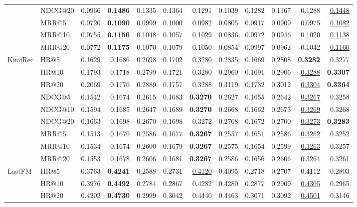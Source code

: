 \begin{tabular}{llrrrrrrrrrr}
 & NDCG@20 & 0.0966 & \textbf{0.1486} & 0.1335 & 0.1364 & 0.1291 & 0.1039 & 0.1282 & 0.1167 & 0.1288 & \underline{0.1448} \\
 & MRR@5 & 0.0720 & \textbf{0.1090} & 0.0999 & 0.1000 & 0.0982 & 0.0805 & 0.0917 & 0.0909 & 0.0975 & \underline{0.1082} \\
 & MRR@10 & 0.0755 & \textbf{0.1150} & 0.1048 & 0.1057 & 0.1029 & 0.0836 & 0.0972 & 0.0946 & 0.1020 & \underline{0.1138} \\
 & MRR@20 & 0.0772 & \textbf{0.1175} & 0.1070 & 0.1079 & 0.1050 & 0.0854 & 0.0997 & 0.0962 & 0.1042 & \underline{0.1160} \\
\hline
KuaiRec & HR@5 & 0.1629 & 0.1686 & 0.2698 & 0.1702 & \underline{0.3280} & 0.2835 & 0.1669 & 0.2808 & \textbf{0.3282} & 0.3277 \\
 & HR@10 & 0.1793 & 0.1718 & 0.2799 & 0.1721 & 0.3280 & 0.2960 & 0.1691 & 0.2906 & \underline{0.3288} & \textbf{0.3307} \\
 & HR@20 & 0.2069 & 0.1770 & 0.2889 & 0.1757 & 0.3288 & 0.3119 & 0.1732 & 0.3012 & \underline{0.3304} & \textbf{0.3364} \\
 & NDCG@5 & 0.1542 & 0.1674 & 0.2615 & 0.1683 & \textbf{0.3270} & 0.2627 & 0.1655 & 0.2642 & \underline{0.3267} & 0.3258 \\
 & NDCG@10 & 0.1594 & 0.1685 & 0.2647 & 0.1689 & \textbf{0.3270} & 0.2668 & 0.1662 & 0.2673 & \underline{0.3269} & 0.3268 \\
 & NDCG@20 & 0.1663 & 0.1698 & 0.2670 & 0.1698 & 0.3272 & 0.2708 & 0.1672 & 0.2700 & \underline{0.3273} & \textbf{0.3283} \\
 & MRR@5 & 0.1513 & 0.1670 & 0.2586 & 0.1677 & \textbf{0.3267} & 0.2557 & 0.1651 & 0.2586 & \underline{0.3262} & 0.3252 \\
 & MRR@10 & 0.1534 & 0.1674 & 0.2600 & 0.1679 & \textbf{0.3267} & 0.2575 & 0.1654 & 0.2599 & \underline{0.3263} & 0.3257 \\
 & MRR@20 & 0.1553 & 0.1678 & 0.2606 & 0.1681 & \textbf{0.3267} & 0.2586 & 0.1656 & 0.2606 & \underline{0.3264} & 0.3261 \\
\hline
LastFM & HR@5 & 0.3763 & \textbf{0.4241} & 0.2588 & 0.2731 & \underline{0.4120} & 0.4095 & 0.2718 & 0.2707 & 0.4112 & 0.2803 \\
 & HR@10 & 0.3976 & \textbf{0.4492} & 0.2784 & 0.2867 & 0.4282 & 0.4280 & 0.2877 & 0.2909 & \underline{0.4305} & 0.2965 \\
 & HR@20 & 0.4202 & \textbf{0.4730} & 0.2999 & 0.3042 & 0.4440 & 0.4463 & 0.3071 & 0.3092 & \underline{0.4501} & 0.3146 \\

\end{tabular}
